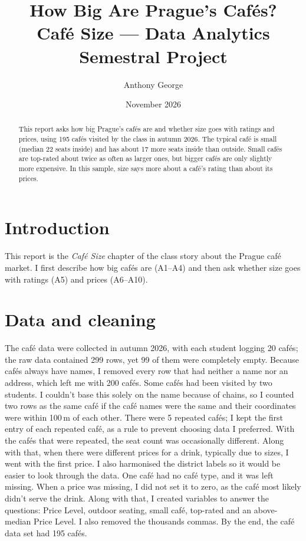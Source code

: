 \documentclass[11pt]{article}
\title{How Big Are Prague's Caf\'es?\\\large Café Size --- Data Analytics Semestral Project}
\author{Anthony George}
\date{November 2026}
\begin{document}
\maketitle

\begin{abstract}
This report asks how big Prague's cafés are and whether size goes with ratings and prices, using 195 cafés visited by the class in autumn 2026. The typical café is small (median 22 seats inside) and has about 17 more seats inside than outside. Small cafés are top-rated about twice as often as larger ones, but bigger cafés are only slightly more expensive. In this sample, size says more about a café's rating than about its prices.
\end{abstract}

\section{Introduction}
This report is the \emph{Café Size} chapter of the class story about the Prague café market. I first describe how big cafés are (A1--A4) and then ask whether size goes with ratings (A5) and prices (A6--A10).

\section{Data and cleaning}
The café data were collected in autumn 2026, with each student logging 20 cafés; the raw data contained 299 rows, yet 99 of them were completely empty. Because cafés always have names, I removed every row that had neither a name nor an address, which left me with 200 cafés. Some cafés had been visited by two students. I couldn't base this solely on the name because of chains, so I counted two rows as the same café if the café names were the same and their coordinates were within 100\,m of each other. There were 5 repeated cafés; I kept the first entry of each repeated café, as a rule to prevent choosing data I preferred. With the cafés that were repeated, the seat count was occasionally different. Along with that, when there were different prices for a drink, typically due to sizes, I went with the first price. I also harmonised the district labels so it would be easier to look through the data. One café had no café type, and it was left missing. When a price was missing, I did not set it to zero, as the café most likely didn't serve the drink. Along with that, I created variables to answer the questions: Price Level, outdoor seating, small café, top-rated and an above-median Price Level. I also removed the thousands commas. By the end, the café data set had 195 cafés.
\end{document}
